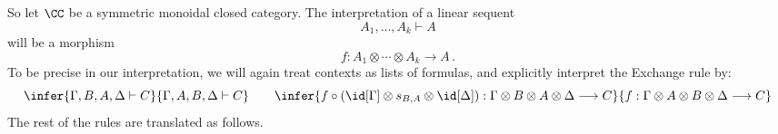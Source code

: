 \documentclass{svmult}
\begin{document}
So let $\CC $ be a symmetric monoidal closed category. The interpretation of a linear sequent
\[ A_1 , \ldots , A_k \vdash A \]
will be a morphism
\[ f : A_1 \otimes \cdots \otimes A_k \longrightarrow A\,. \]
%
To be precise in our interpretation, we will again treat contexts as {lists} of formulas, and explicitly interpret the Exchange rule by:
\[ \infer{\Gamma , B, A, \Delta \vdash C}{\Gamma , A, B, \Delta  \vdash C}
\qquad \infer{f \circ (\id[\Gamma] \otimes s_{B, A} \otimes \id[\Delta])   : \Gamma
  \otimes B \otimes A \otimes \Delta \longrightarrow C}{f : \Gamma \otimes  A \otimes B \otimes \Delta \longrightarrow C}\]
%
The rest of the rules are translated as follows.
\begin{center}\renewcommand{\arraystretch}{0.6}
 
\end{center}
\end{document}
